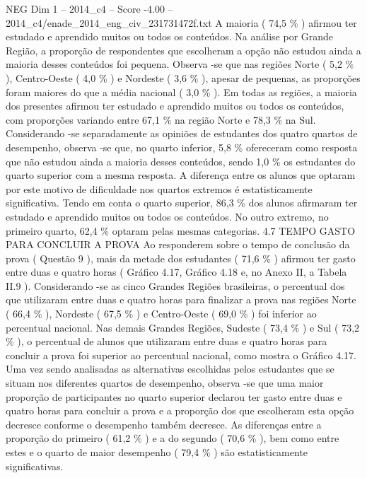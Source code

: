 \begin{textsample}{NEG Dim 1 – 2014\_c4 – Score -4.00 – 2014\_c4/enade\_2014\_eng\_civ\_231731472f.txt}
A maioria ( 74,5 \% ) afirmou ter estudado e aprendido muitos ou todos os conteúdos.
Na análise por Grande Região, a proporção de respondentes que escolheram a opção não estudou ainda a maioria desses conteúdos foi pequena.
Observa -se que nas regiões Norte ( 5,2 \% ), Centro-Oeste ( 4,0 \% ) e Nordeste ( 3,6 \% ), apesar de pequenas, as proporções foram maiores do que a média nacional ( 3,0 \% ).
Em todas as regiões, a maioria dos presentes afirmou ter estudado e aprendido muitos ou todos os conteúdos, com proporções variando entre 67,1 \% na região Norte e 78,3 \% na Sul.
Considerando -se separadamente as opiniões de estudantes dos quatro quartos de desempenho, observa -se que, no quarto inferior, 5,8 \% ofereceram como resposta que não estudou ainda a maioria desses conteúdos, sendo 1,0 \% os estudantes do quarto superior com a mesma resposta.
A diferença entre os alunos que optaram por este motivo de dificuldade nos quartos extremos é estatisticamente significativa.
Tendo em conta o quarto superior, 86,3 \% dos alunos afirmaram ter estudado e aprendido muitos ou todos os conteúdos.
No outro extremo, no primeiro quarto, 62,4 \% optaram pelas mesmas categorias. 4.7 TEMPO GASTO PARA CONCLUIR A PROVA Ao responderem sobre o tempo de conclusão da prova ( Questão 9 ), mais da metade dos estudantes ( 71,6 \% ) afirmou ter gasto entre duas e quatro horas ( Gráfico 4.17, Gráfico 4.18 e, no Anexo II, a Tabela II.9 ).
Considerando -se as cinco Grandes Regiões brasileiras, o percentual dos que utilizaram entre duas e quatro horas para finalizar a prova nas regiões Norte ( 66,4 \% ), Nordeste ( 67,5 \% ) e Centro-Oeste ( 69,0 \% ) foi inferior ao percentual nacional.
Nas demais Grandes Regiões, Sudeste ( 73,4 \% ) e Sul ( 73,2 \% ), o percentual de alunos que utilizaram entre duas e quatro horas para concluir a prova foi superior ao percentual nacional, como mostra o Gráfico 4.17.
Uma vez sendo analisadas as alternativas escolhidas pelos estudantes que se situam nos diferentes quartos de desempenho, observa -se que uma maior proporção de participantes no quarto superior declarou ter gasto entre duas e quatro horas para concluir a prova e a proporção dos que escolheram esta opção decresce conforme o desempenho também decresce.
As diferenças entre a proporção do primeiro ( 61,2 \% ) e a do segundo ( 70,6 \% ), bem como entre estes e o quarto de maior desempenho ( 79,4 \% ) são estatisticamente significativas.

\end{textsample}

